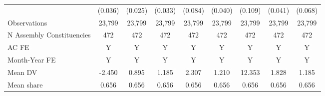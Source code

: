 {\begin{tabular}{l*{8}{c}}
            &     (0.036)         &     (0.025)         &     (0.033)         &     (0.084)         &     (0.040)         &     (0.109)         &     (0.041)         &     (0.068)         \\
Observations&      23,799         &      23,799         &      23,799         &      23,799         &      23,799         &      23,799         &      23,799         &      23,799         \\
N Assembly Constituencies&         472         &         472         &         472         &         472         &         472         &         472         &         472         &         472         \\
AC FE       &           Y         &           Y         &           Y         &           Y         &           Y         &           Y         &           Y         &           Y         \\
Month-Year FE&           Y         &           Y         &           Y         &           Y         &           Y         &           Y         &           Y         &           Y         \\
Mean DV     &      -2.450         &       0.895         &       1.185         &       2.307         &       1.210         &      12.353         &       1.828         &       1.185         \\
Mean share  &       0.656         &       0.656         &       0.656         &       0.656         &       0.656         &       0.656         &       0.656         &       0.656         \\
\bottomrule
\end{tabular}
}
